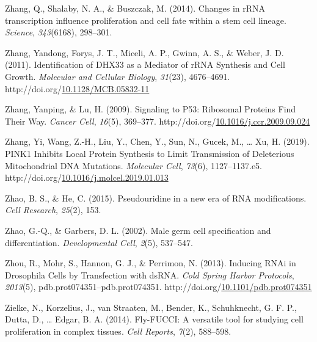 \documentclass[12pt,oneside]{reedthesis}
\newlength{\cslhangindent}
\newenvironment{CSLReferences}[2] %
 {%
  \setlength{\parindent}{0pt}
  \ifodd #1 \everypar{\setlength{\hangindent}{\cslhangindent}}\ignorespaces\fi
  \ifnum #2 > 0
  \setlength{\parskip}{#2\baselineskip}
  \fi
 }%
 {}
\begin{document}
\begin{CSLReferences}{1}{0}
\leavevmode{}%
Zhang, Q., Shalaby, N. A., \& Buszczak, M. (2014). Changes in {rRNA} transcription influence proliferation and cell fate within a stem cell lineage. \emph{Science}, \emph{343}(6168), 298--301.

\leavevmode{}%
Zhang, Yandong, Forys, J. T., Miceli, A. P., Gwinn, A. S., \& Weber, J. D. (2011). Identification of {DHX33} as a {Mediator} of {rRNA Synthesis} and {Cell Growth}. \emph{Molecular and Cellular Biology}, \emph{31}(23), 4676--4691. http://doi.org/\href{https://doi.org/10.1128/MCB.05832-11}{10.1128/MCB.05832-11}

\leavevmode{}%
Zhang, Yanping, \& Lu, H. (2009). Signaling to P53: {Ribosomal Proteins Find Their Way}. \emph{Cancer Cell}, \emph{16}(5), 369--377. http://doi.org/\href{https://doi.org/10.1016/j.ccr.2009.09.024}{10.1016/j.ccr.2009.09.024}

\leavevmode{}%
Zhang, Yi, Wang, Z.-H., Liu, Y., Chen, Y., Sun, N., Gucek, M., \ldots{} Xu, H. (2019). {PINK1 Inhibits Local Protein Synthesis} to {Limit Transmission} of {Deleterious Mitochondrial DNA Mutations}. \emph{Molecular Cell}, \emph{73}(6), 1127--1137.e5. http://doi.org/\href{https://doi.org/10.1016/j.molcel.2019.01.013}{10.1016/j.molcel.2019.01.013}

\leavevmode{}%
Zhao, B. S., \& He, C. (2015). Pseudouridine in a new era of {RNA} modifications. \emph{Cell Research}, \emph{25}(2), 153.

\leavevmode{}%
Zhao, G.-Q., \& Garbers, D. L. (2002). Male germ cell specification and differentiation. \emph{Developmental Cell}, \emph{2}(5), 537--547.

\leavevmode{}%
Zhou, R., Mohr, S., Hannon, G. J., \& Perrimon, N. (2013). Inducing {RNAi} in {Drosophila Cells} by {Transfection} with {dsRNA}. \emph{Cold Spring Harbor Protocols}, \emph{2013}(5), pdb.prot074351--pdb.prot074351. http://doi.org/\href{https://doi.org/10.1101/pdb.prot074351}{10.1101/pdb.prot074351}

\leavevmode{}%
Zielke, N., Korzelius, J., van Straaten, M., Bender, K., Schuhknecht, G. F. P., Dutta, D., \ldots{} Edgar, B. A. (2014). Fly-{FUCCI}: {A} versatile tool for studying cell proliferation in complex tissues. \emph{Cell Reports}, \emph{7}(2), 588--598.

\end{CSLReferences}

\end{document}
